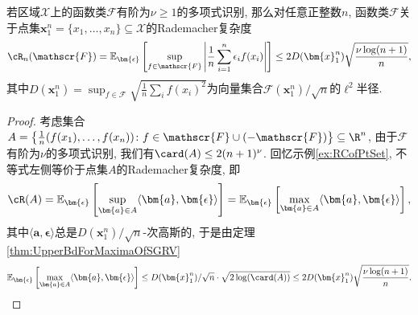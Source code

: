 \begin{lemma}\label{lemma:RCOfPolynomialDiscriminationFunClass}
	若区域$\mathcal{X}$上的函数类$\mathscr{F}$有阶为$\nu \geq 1$的多项式识别, 那么对任意正整数$n$, 函数类$\mathscr{F}$关于点集$\bm{x}_1^n = \{x_1, \dots, x_n\} \subseteq \mathcal{X}$的Rademacher复杂度
	\begin{equation*}
		\cR_n(\mathscr{F})
		= \mathbb{E}_{\bm{\epsilon}} \left[ \sup_{f \in \mathscr{F}} \left| \frac{1}{n} \sum_{i=1}^n \epsilon_i f(x_i) \right| \right]
		\leq 2 D(\bm{x}_1^n) \sqrt{\frac{\nu \log(n+1)}{n}}, 
	\end{equation*}
	其中$D(\bm{x}_1^n) = \sup_{f \in \mathscr{F}} \sqrt{\frac{1}{n} \sum_i f(x_i)^2}$为向量集合$\mathscr{F}(\bm{x}_1^n) / \sqrt{n}$的$\ell^2$半径. 
\end{lemma}
\begin{proof}
	考虑集合$A = \left\{ \frac{1}{n} (f(x_1), \dots, f(x_n)) \colon f \in \mathscr{F} \cup (-\mathscr{F}) \right\} \subseteq \R^n$, 由于$\mathscr{F}$有阶为$\nu$的多项式识别, 我们有$\card(A) \leq 2 (n+1)^{\nu}$. 
	回忆示例\ref{ex:RCofPtSet}, 不等式左侧等价于点集$A$的Rademacher复杂度, 即
	\begin{equation*}
		\cR(A) 
		= \mathbb{E}_{\bm{\epsilon}}\left[ \sup_{\bm{a} \in A} \langle \bm{a}, \bm{\epsilon} \rangle \right]
		= \mathbb{E}_{\bm{\epsilon}}\left[ \max_{\bm{a} \in A} \langle \bm{a}, \bm{\epsilon} \rangle \right], 
	\end{equation*}
	其中$\langle \bm{a}, \bm{\epsilon} \rangle$总是$D(\bm{x}_1^n) / \sqrt{n}$-次高斯的, 于是由定理\ref{thm:UpperBdForMaximaOfSGRV}
	\begin{align*}
		\mathbb{E}_{\bm{\epsilon}}\left[ \max_{\bm{a} \in A} \langle \bm{a}, \bm{\epsilon} \rangle \right] 
		\leq D(\bm{x}_1^n) / \sqrt{n} \cdot \sqrt{2 \log(\card(A))}
		\leq 2 D(\bm{x}_1^n) \sqrt{\frac{\nu \log(n+1)}{n}}. 
	\end{align*}
\end{proof}

